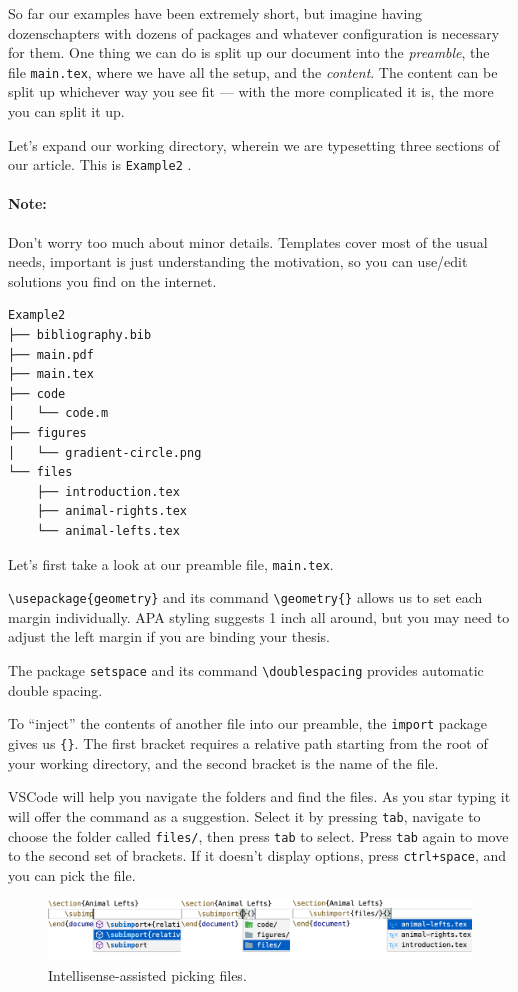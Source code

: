 So far our examples have been extremely short, but imagine having dozenschapters with dozens of packages and whatever configuration is necessary for them.
One thing we can do is split up our document into the \emph{preamble}, the file \verb|main.tex|, where we have all the setup, and the \emph{content}.
The content can be split up whichever way you see fit --- with the more complicated it is, the more you can split it up. 

Let's expand our working directory, wherein we are typesetting three sections of our article. This is \verb|Example2| .

\paragraph{Note:}
Don't worry too much about minor details.
Templates cover most of the usual needs, important is just understanding the motivation, so you can use/edit solutions you find on the internet.
\begin{verbatim}
Example2
├── bibliography.bib
├── main.pdf
├── main.tex
├── code
│   └── code.m
├── figures
│   └── gradient-circle.png
└── files
    ├── introduction.tex
    ├── animal-rights.tex
    └── animal-lefts.tex
\end{verbatim}

Let's first take a look at our preamble file, \verb|main.tex|.


\verb|\usepackage{geometry}| and its command \verb|\geometry{}| allows us to set each margin individually.
APA styling suggests 1 inch all around, but you may need to adjust the left margin if you are binding your thesis.

The package \verb|setspace| and its command \verb|\doublespacing| provides automatic double spacing.

To ``inject'' the contents of another file into our preamble, the \verb|import| package gives us \verb|{}|.
The first bracket requires a relative path starting from the root of your working directory, and the second bracket is the name of the file.

VSCode will help you navigate the folders and find the files.
As you star typing \verb|| it will offer the command as a suggestion.
Select it by pressing \verb|tab|, navigate to choose the folder called \verb|files/|, then press \verb|tab| to select.
Press \verb|tab| again to move to the second set of brackets. If it doesn't display options, press \verb|ctrl+space|, and you can pick the file.
\begin{figure}[h]
    \centering
    \includegraphics[width=\textwidth]{figures/subimport.png}
    \caption{Intellisense-assisted picking files.}
    \label{fig:animal-lefts}
\end{figure}

